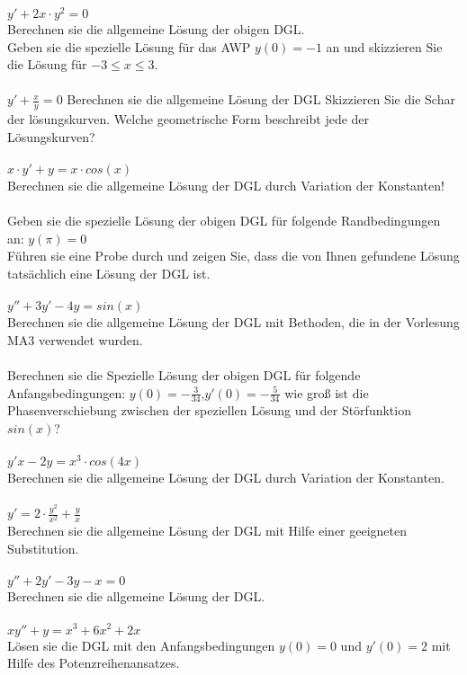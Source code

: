 \documentclass[A4]{scrartcl}
\begin{document}
$y'+2x\cdot y^2 = 0 $\\
Berechnen sie die allgemeine Lösung der obigen DGL.\\
Geben sie die spezielle Lösung für das AWP $y(0) = -1 $ an und skizzieren Sie die Lösung für $-3 \leq x \leq 3$.\\\\
$y' + \frac{x}{y} = 0$
Berechnen sie die allgemeine Lösung der DGL
Skizzieren Sie die Schar der lösungskurven. Welche geometrische Form beschreibt jede der Lösungskurven?\\\\
$x \cdot y' + y = x \cdot cos(x)$\\
Berechnen sie die allgemeine Lösung der DGL durch Variation der Konstanten!\\\\
Geben sie die spezielle Lösung der obigen DGL für folgende Randbedingungen an: $y(\pi ) = 0$\\
Führen sie eine Probe durch und zeigen Sie, dass die von Ihnen gefundene Lösung tatsächlich eine Lösung der DGL ist.\\\\
$y''+3y'-4y = sin (x)$\\
Berechnen sie die allgemeine Lösung der DGL mit Bethoden, die in der Vorlesung MA3 verwendet wurden.\\\\
Berechnen sie die Spezielle Lösung der obigen DGL für folgende Anfangsbedingungen:
$y(0)=-\frac{3}{34}$,$y'(0) = -\frac{5}{34}$
wie groß ist die Phasenverschiebung zwischen der speziellen Lösung und der Störfunktion $sin(x)$?\\\\
$y'x-2y=x^3 \cdot cos(4x)$\\
Berechnen sie die allgemeine Lösung der DGL durch Variation der Konstanten. \\\\
$y' = 2 \cdot \frac{y^2}{x^2}+\frac{y}{x}$\\
Berechnen sie die allgemeine Lösung der DGL mit Hilfe einer geeigneten Substitution.\\\\
$y''+2y'-3y-x=0$\\
Berechnen sie die allgemeine Lösung der DGL.\\\\
$xy''+y = x^3 +6x^2 +2x$\\
Lösen sie die DGL mit den Anfangsbedingungen $y(0) = 0 $ und $y'(0) = 2$ mit Hilfe des Potenzreihenansatzes.\\
\end{document}
